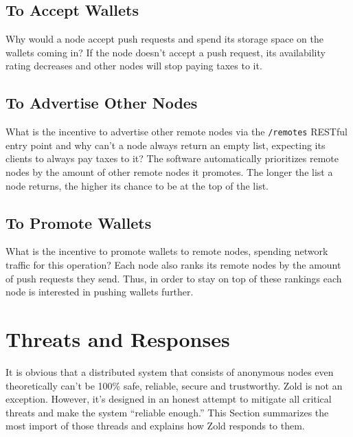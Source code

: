 \documentclass[11pt,oneside]{article}
\newcommand\dd[1]{\colorbox{gray!30}{\texttt{#1}}}
\begin{document}
\subsection{To Accept Wallets}

Why would a node accept push requests and spend its storage space
on the wallets coming in? If the node doesn't accept a push request,
its availability rating decreases and other nodes will stop paying
taxes to it.

\subsection{To Advertise Other Nodes}

What is the incentive to advertise other remote nodes via the \dd{/remotes} RESTful
entry point and why can't a node always return an empty list, expecting its clients
to always pay taxes to it? The software automatically prioritizes remote
nodes by the amount of other remote nodes it promotes. The longer the list a node
returns, the higher its chance to be at the top of the list.

\subsection{To Promote Wallets}

What is the incentive to promote wallets to remote nodes, spending network
traffic for this operation? Each node also ranks its remote nodes by the
amount of push requests they send. Thus, in order to stay on top of these rankings
each node is interested in pushing wallets further.


\section{Threats and Responses}\label{sec:threats}

It is obvious that a distributed system that consists of anonymous nodes
even theoretically can't be 100\% safe, reliable, secure and trustworthy.
Zold is not an exception. However, it's designed in an honest attempt
to mitigate all critical threats and make the system ``reliable enough.''
This Section summarizes the most import of those threads and explains
how Zold responds to them.
\end{document}
